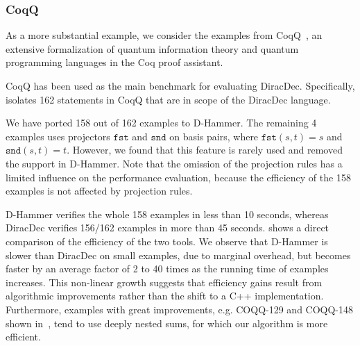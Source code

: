 \subsubsection{CoqQ}
As a more substantial example, we consider the examples from
CoqQ~\cite{Zhou2023}, an extensive formalization of quantum
information theory and quantum programming languages in the
Coq proof assistant.

CoqQ has been used as the main benchmark for evaluating DiracDec.
Specifically, \cite{diracdec} isolates 162 statements in CoqQ that
are in scope of the DiracDec language.

We have ported 158 out of 162 examples to D-Hammer. The remaining 4
examples uses projectors $\texttt{fst}$ and $\texttt{snd}$ on basis
pairs, where $\texttt{fst} (s, t) = s$ and $\texttt{snd} (s, t) =
t$. However, we found that this feature is rarely used and removed the
support in D-Hammer. Note that the omission of the projection rules
has a limited influence on the performance evaluation, because the
efficiency of the 158 examples is not affected by projection rules.

D-Hammer verifies the whole 158 examples in less than 10 seconds,
whereas DiracDec verifies 156/162 examples in more than 45 seconds.
 shows a direct comparison of the efficiency of
the two tools. We observe that D-Hammer is slower than DiracDec on
small examples, due to marginal overhead, but becomes faster by an
average factor of 2 to 40 times as the running time of examples
increases. This non-linear growth suggests that efficiency gains
result from algorithmic improvements rather than the shift to a C++
implementation. Furthermore, examples with great improvements,
e.g. COQQ-129 and COQQ-148 shown in~, tend to use
deeply nested sums, for which our algorithm is more efficient.

 



